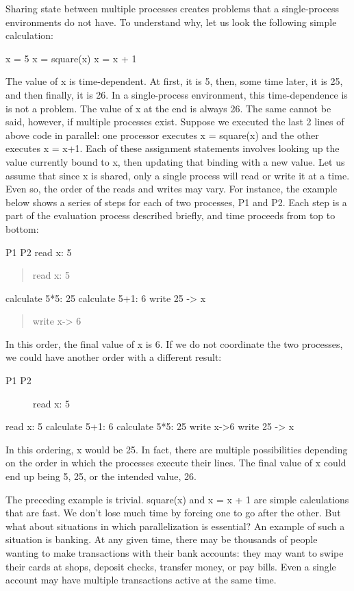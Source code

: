 \documentclass[letterpaper,10pt,dvipdfmx]{sphinxmanual}
\begin{document}
Sharing state between multiple processes creates problems that a single-process environments do not have. To understand why, let us look the following simple calculation:

x = 5
x = square(x)
x = x + 1

The value of x is time-dependent. At first, it is 5, then, some time later, it is 25, and then finally, it is 26. In a single-process environment, this time-dependence is is not a problem. The value of x at the end is always 26. The same cannot be said, however, if multiple processes exist. Suppose we executed the last 2 lines of above code in parallel: one processor executes x = square(x) and the other executes x = x+1. Each of these assignment statements involves looking up the value currently bound to x, then updating that binding with a new value. Let us assume that since x is shared, only a single process will read or write it at a time. Even so, the order of the reads and writes may vary. For instance, the example below shows a series of steps for each of two processes, P1 and P2. Each step is a part of the evaluation process described briefly, and time proceeds from top to bottom:

P1                    P2
read x: 5
\begin{quote}

read x: 5
\end{quote}

calculate 5*5: 25     calculate 5+1: 6
write 25 -\textgreater{} x
\begin{quote}

write x-\textgreater{} 6
\end{quote}

In this order, the final value of x is 6. If we do not coordinate the two processes, we could have another order with a different result:
\begin{description}
\item[{P1                    P2}] \leavevmode
read x: 5

\end{description}

read x: 5             calculate 5+1: 6
calculate 5*5: 25     write x-\textgreater{}6
write 25 -\textgreater{} x

In this ordering, x would be 25. In fact, there are multiple possibilities depending on the order in which the processes execute their lines. The final value of x could end up being 5, 25, or the intended value, 26.

The preceding example is trivial. square(x) and x = x + 1 are simple calculations that are fast. We don't lose much time by forcing one to go after the other. But what about situations in which parallelization is essential? An example of such a situation is banking. At any given time, there may be thousands of people wanting to make transactions with their bank accounts: they may want to swipe their cards at shops, deposit checks, transfer money, or pay bills. Even a single account may have multiple transactions active at the same time.
\end{document}
